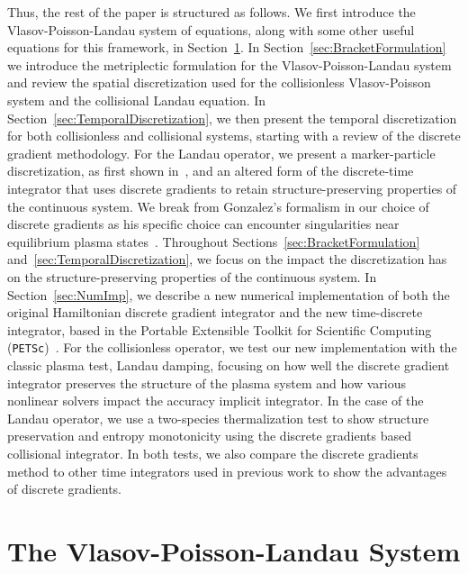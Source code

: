 \documentclass[preprint,12pt]{elsarticle}
\theoremstyle{definition}
\begin{document}
Thus, the rest of the paper is structured as follows. We first introduce the Vlasov-Poisson-Landau system of equations, along with some other useful equations for this framework, in Section~\ref{sec:VPLSystem}.
In Section~\ref{sec:BracketFormulation} we introduce the metriplectic formulation for the Vlasov-Poisson-Landau system and review the spatial discretization used for the collisionless Vlasov-Poisson system and  the collisional Landau equation. In Section~\ref{sec:TemporalDiscretization}, we then present the temporal discretization for both collisionless and collisional systems, starting with a review of the discrete gradient methodology. For the Landau operator, we present a marker-particle discretization, as first shown in~\cite{Carrillo2020,Hirvijoki2021}, and an altered form of the discrete-time integrator that uses discrete gradients to retain structure-preserving properties of the continuous system. We break from Gonzalez's formalism in our choice of discrete gradients as his specific choice can encounter singularities near equilibrium plasma states~\cite{Liu2023}. Throughout Sections~\ref{sec:BracketFormulation} and~\ref{sec:TemporalDiscretization}, we focus on the impact the discretization has on the structure-preserving properties of the continuous system. 
In Section~\ref{sec:NumImp}, we describe a new numerical implementation of both the original Hamiltonian discrete gradient integrator and the new time-discrete integrator, based in the Portable Extensible Toolkit for Scientific Computing (\texttt{PETSc})~\cite{AbhyankarBrownConstantinescuGhoshSmith2014,petsc-web-page,PETScManual}. For the collisionless operator, we test our new implementation with the classic plasma test, Landau damping, focusing on how well the discrete gradient integrator preserves the structure of the plasma system and how various nonlinear solvers impact the accuracy implicit integrator. In the case of the Landau operator, we use a two-species thermalization test to show structure preservation and entropy monotonicity using the discrete gradients based collisional integrator. In both tests, we also compare the discrete gradients method to other time integrators used in previous work to show the advantages of discrete gradients. 

\section{The Vlasov-Poisson-Landau System}\label{sec:VPLSystem}
\end{document}
